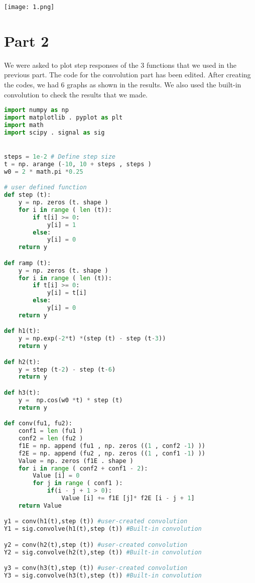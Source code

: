 \documentclass[12pt]{report}
\begin{document}
\texttt{[image: 1.png]}

\section{Part 2 }

We were asked to plot step responses of the 3 functions that we used in the previous part. The code for the convolution part has been edited. After creating the codes, we had 6 graphs as shown in the results. We also used the built-in convolution to check the results that we made.

\begin{lstlisting}[language=Python]
import numpy as np
import matplotlib . pyplot as plt
import math
import scipy . signal as sig


steps = 1e-2 # Define step size
t = np. arange (-10, 10 + steps , steps ) 
w0 = 2 * math.pi *0.25 

# user defined function
def step (t): 
    y = np. zeros (t. shape ) 
    for i in range ( len (t)): 
        if t[i] >= 0:  
            y[i] = 1
        else:
            y[i] = 0
    return y 

def ramp (t): 
    y = np. zeros (t. shape ) 
    for i in range ( len (t)): 
        if t[i] >= 0:  
            y[i] = t[i]
        else:
            y[i] = 0
    return y 

def h1(t):
    y = np.exp(-2*t) *(step (t) - step (t-3))
    return y

def h2(t):
    y = step (t-2) - step (t-6)
    return y

def h3(t):
    y =  np.cos(w0 *t) * step (t)
    return y

def conv(fu1, fu2):
    conf1 = len (fu1 )
    conf2 = len (fu2 )
    f1E = np. append (fu1 , np. zeros ((1 , conf2 -1) ))
    f2E = np. append (fu2 , np. zeros ((1 , conf1 -1) ))
    Value = np. zeros (f1E . shape )
    for i in range ( conf2 + conf1 - 2):
        Value [i] = 0
        for j in range ( conf1 ):
            if(i - j + 1 > 0):
                Value [i] += f1E [j]* f2E [i - j + 1]
    return Value

y1 = conv(h1(t),step (t)) #user-created convolution
Y1 = sig.convolve(h1(t),step (t)) #Built-in convolution

y2 = conv(h2(t),step (t)) #user-created convolution
Y2 = sig.convolve(h2(t),step (t)) #Built-in convolution

y3 = conv(h3(t),step (t)) #user-created convolution
Y3 = sig.convolve(h3(t),step (t)) #Built-in convolution


\end{lstlisting}
\end{document}
